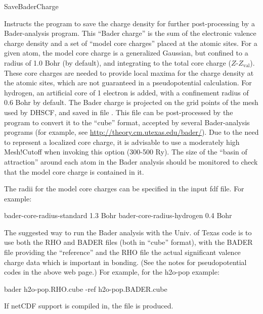 \begin{fdflogicalF}{SaveBaderCharge}

  Instructs the program to save the charge density for further
  post-processing by a Bader-analysis program.  This ``Bader
  charge'' is the sum of the electronic valence charge density and a
  set of ``model core charges'' placed at the atomic sites. For a
  given atom, the model core charge is a generalized Gaussian, but
  confined to a radius of 1.0 Bohr (by default), and integrating to
  the total core charge ($Z$-$Z_{\mathrm{val}}$). These core charges are
  needed to provide local maxima for the charge density at the atomic
  sites, which are not guaranteed in a pseudopotential calculation.
  For hydrogen, an artificial core of 1 electron is added,
  with a confinement radius of 0.6 Bohr by default. The Bader
  charge is projected on the grid points of the mesh used by DHSCF,
  and saved in file . This file can be
  post-processed by the program  to convert it to
  the ``cube'' format, accepted by several Bader-analysis programs
  (for example, see \url{http://theory.cm.utexas.edu/bader/}).  Due to
  the need to represent a localized core charge, it is advisable to
  use a moderately high Mesh!Cutoff when invoking this option (300-500
  Ry). The size of the ``basin of attraction'' around each atom in
  the Bader analysis should be monitored to check that the model core
  charge is contained in it.

  The radii for the model core charges can be specified in the input
  fdf file. For example:

    \begin{fdfexample}
       bader-core-radius-standard  1.3 Bohr
       bader-core-radius-hydrogen  0.4 Bohr
    \end{fdfexample}
  
  The suggested way to run the Bader analysis with the Univ. of
  Texas code is to use both the RHO and BADER files (both in
  ``cube'' format), with the BADER file providing the ``reference''
  and the RHO file the actual significant valence charge data which
  is important in bonding. (See the notes for pseudopotential codes
  in the above web page.) For example, for the h2o-pop example:

  \begin{shellexample}
    bader h2o-pop.RHO.cube -ref h2o-pop.BADER.cube
  \end{shellexample}

  If netCDF support is compiled in, the file 
  is produced.

\end{fdflogicalF}


